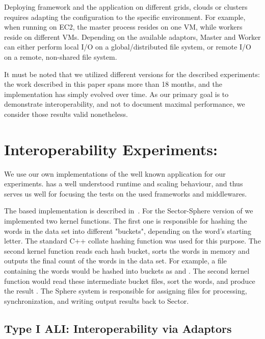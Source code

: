 \documentclass[graybox]{svmult}
\begin{document}
Deploying \sagamapreduce framework and the \wc application on
different grids, clouds or clusters requires adapting the configuration
to the specific environment.  For example, when running \sagamapreduce
on EC2, the master process resides on one VM, while workers reside on
different VMs.  Depending on the available adaptors, Master and Worker
can either perform local I/O on a global/distributed file system, or
remote I/O on a remote, non-shared file system.

It must be noted that we utilized different \smr versions for the
described experiments: the work described in this paper spans more
than 18 months, and the \smr implementation has simply evolved over
time.  As our primary goal is to demonstrate interoperability, and not
to document maximal performance, we consider those results valid
nonetheless.

\section{Interoperability Experiments: \Wc}
\label{sec:exp}


We use our own implementations of the well known \wc application for
our experiments.  \Wc has a well understood runtime and scaling
behaviour, and thus serves us well for focusing the tests on the used
frameworks and middlewares.

The \mr based \wc implementation is described in~\cite{saga_ccgrid09}.
For the Sector-Sphere version of \wc we implemented two kernel
functions. The first one is responsible for hashing the
words in the data set into different "buckets", depending on
the word's starting letter.  The standard C++ collate hashing function
was used for this purpose.  The second kernel function reads each hash
bucket, sorts the words in memory and outputs the final count of
the words in the data set.  For example, a file containing the words
 would be hashed into buckets as
 and .  The second kernel
function would read these intermediate bucket files, sort the words,
and produce the result .  The Sphere system is responsible for assigning files for
processing, synchronization, and writing output results back to
Sector.

\subsection{Type I ALI: Interoperability via Adaptors}
\end{document}
